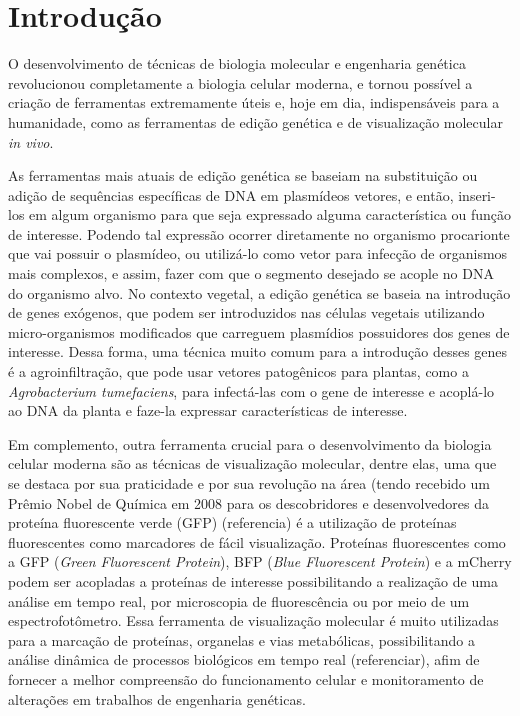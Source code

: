 \section{Introdução} 
O desenvolvimento de técnicas de biologia molecular e engenharia genética revolucionou completamente a biologia celular moderna, e tornou possível a criação de ferramentas extremamente úteis e, hoje em dia, indispensáveis para a humanidade, como as ferramentas de edição genética e de visualização molecular \textit{in vivo}.

As ferramentas mais atuais de edição genética se baseiam na substituição ou adição de sequências específicas de DNA em plasmídeos vetores, e então, inseri-los em algum organismo para que seja expressado alguma característica ou função de interesse. Podendo tal expressão ocorrer diretamente no organismo procarionte que vai possuir o plasmídeo, ou utilizá-lo como vetor para infecção de organismos mais complexos, e assim, fazer com que o segmento desejado se acople no DNA do organismo alvo. No contexto vegetal, a edição genética se baseia na introdução de genes exógenos, que podem ser introduzidos nas células vegetais utilizando micro-organismos modificados que carreguem plasmídios possuidores dos genes de interesse. Dessa forma, uma técnica muito comum para a introdução desses genes é a agroinfiltração, que pode usar vetores patogênicos para plantas, como a \textit{Agrobacterium tumefaciens}, para infectá-las com o gene de interesse e acoplá-lo ao DNA da planta e faze-la expressar características de interesse.

Em complemento, outra ferramenta crucial para o desenvolvimento da biologia celular moderna são as técnicas de visualização molecular, dentre elas, uma que se destaca por sua praticidade e por sua revolução na área (tendo recebido um Prêmio Nobel de Química em 2008 para os descobridores e desenvolvedores da proteína fluorescente verde (GFP) (referencia) é a utilização de proteínas fluorescentes como marcadores de fácil visualização. Proteínas fluorescentes como a GFP (\textit{Green Fluorescent Protein}), BFP (\textit{Blue Fluorescent Protein}) e a mCherry podem ser acopladas a proteínas de interesse possibilitando a realização de uma análise em tempo real, por microscopia de fluorescência ou por meio de um espectrofotômetro.  Essa ferramenta de visualização molecular é muito utilizadas para a marcação de proteínas, organelas e vias metabólicas, possibilitando a análise dinâmica de processos biológicos em tempo real (referenciar), afim de fornecer a melhor compreensão do funcionamento celular e monitoramento de alterações em trabalhos de engenharia genéticas. 

